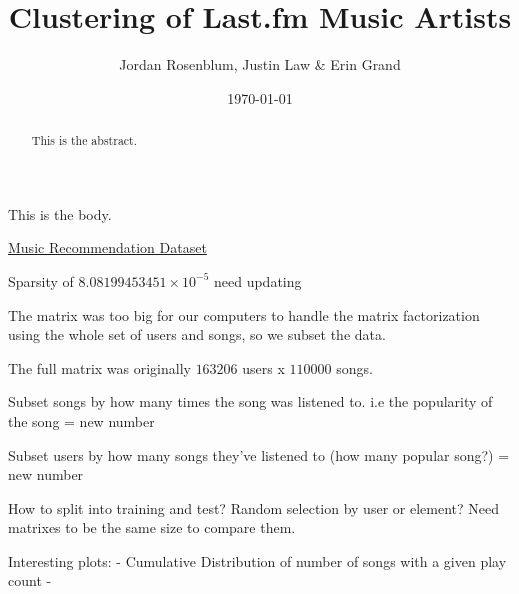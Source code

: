 \documentclass[12pt,preprint]{aastex}
\begin{document}
\title{Clustering of Last.fm Music Artists}

 \author{Jordan Rosenblum, Justin Law \& Erin Grand}
 
\date{\today}             

\begin{abstract}
This is the abstract. 
\end{abstract}


This is the body. 

\href{http://www.dtic.upf.edu/~ocelma/MusicRecommendationDataset/}{Music Recommendation Dataset}

Sparsity of $8.08199453451\times 10^{-5}$ need updating

The matrix was too big for our computers to handle the matrix factorization using the whole set of users and songs, so we subset the data. 

The full matrix was originally $163206$ users x $110000$ songs. 

Subset songs by how many times the song was listened to. i.e the popularity of the song
= new number 

Subset users by how many songs they've listened to (how many popular song?)
= new number 

How to split into training and test? 
Random selection by user or element?
Need matrixes to be the same size to compare them.



Interesting plots:
- Cumulative Distribution of number of songs with a given play count
- 
\end{document}
